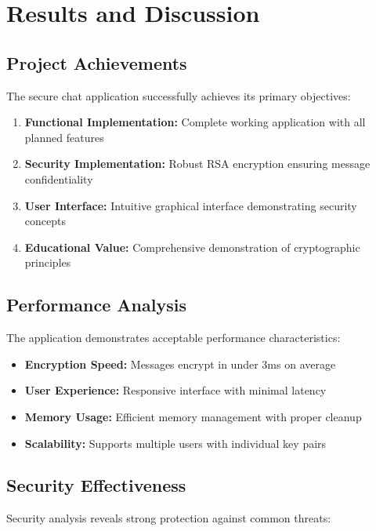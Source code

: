 \documentclass[12pt,a4paper]{article}
\begin{document}
\section{Results and Discussion}

\subsection{Project Achievements}

The secure chat application successfully achieves its primary objectives:

\begin{enumerate}
    \item \textbf{Functional Implementation:} Complete working application with all planned features
    \item \textbf{Security Implementation:} Robust RSA encryption ensuring message confidentiality
    \item \textbf{User Interface:} Intuitive graphical interface demonstrating security concepts
    \item \textbf{Educational Value:} Comprehensive demonstration of cryptographic principles
\end{enumerate}

\subsection{Performance Analysis}

The application demonstrates acceptable performance characteristics:

\begin{itemize}
    \item \textbf{Encryption Speed:} Messages encrypt in under 3ms on average
    \item \textbf{User Experience:} Responsive interface with minimal latency
    \item \textbf{Memory Usage:} Efficient memory management with proper cleanup
    \item \textbf{Scalability:} Supports multiple users with individual key pairs
\end{itemize}

\subsection{Security Effectiveness}

Security analysis reveals strong protection against common threats:
\end{document}

